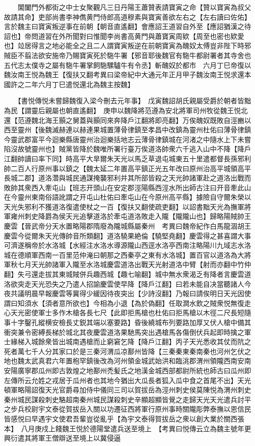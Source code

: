 　　閶闔門外都街之中士女聚觀凡三日丹陽王蕭贊表請寶寅之命【贊以寶寅為叔父故請其命】吏部尚書李神儁黄門侍郎高道穆素與寶寅善欲左右之【左右讀曰佐佑】言於魏主曰寶寅叛逆事在前朝【朝音直遙翻】會應詔王道習自外至【應詔猶漢之待詔也】帝問道習在外所聞對曰惟聞李尚書高黄門與蕭寶寅周欵【周至也密也欵愛也】竝居得言之地必能全之且二人謂寶寅叛逆在前朝寶寅為醜奴太傅豈非陛下時邪賊臣不翦法欲安施帝乃賜寶寅死於駞牛署【邪音耶後魏官有駞牛都尉署者其寺舍也五代志太僕寺之屬有駞牛署掌飼駞騾驢牛有令丞】斬醜奴於都市　六月丁巳帝復以魏汝南王悦為魏王【復扶又翻考異曰梁帝紀中大通元年正月甲子魏汝南王悦求還本國許之二年六月丁巳遣悦還北為魏主按魏】

　　【書悦傳悦未嘗歸魏復入梁今刪去元年事】　戊寅魏詔胡氏親屬受爵於朝者皆黜為民【謂靈后親屬也朝直遙翻】　庚申以魏降將范遵為安北將軍司州牧從魏王悦北還【范遵魏北海王顥之舅蓋與顥同來奔降戶江翻將即亮翻】万俟醜奴既敗自涇豳以西至靈州【後魏滅赫連以赫連果城置薄骨律鎮至孝昌中改鎮為靈州杜佑曰薄骨律鎮今靈武郡富平今迴樂縣唐靈州治迴樂括地志云薄骨律鎮城在河渚之中隨水上下未嘗陷沒故號靈州也】賊黨皆降於魏唯所署行臺万俟道洛帥衆六千逃入山中不降【降戶江翻帥讀曰率下同】時高平大旱爾朱天光以馬乏草退屯城東五十里遣都督長孫邪利帥二百人行原州事以鎮之【魏太延二年置高平鎮正光五年改曰原州治高平城領高平長城二郡】道洛濳與城民通謀掩襲邪利并其所部皆殺之天光帥諸軍赴之道洛出戰而敗帥其衆西入牽屯山【班志开頭山在安定郡涇陽縣西涇水所出師古注曰开音牽此山在今靈州東南俗語訛謂之开屯山杜佑曰牽屯山在今原州高平縣】據險自守爾朱榮以天光失邪利不獲道洛復遣使杖之一百【復扶又翻使疏吏翻】以詔書黜天光為撫軍將軍雍州刺史降爵為侯天光追擊道洛於牽屯道洛敗走入隴【隴隴山也】歸略陽賊帥王慶雲【晉武帝分天水置略陽郡隋廢為隴城縣屬秦州　考異曰魏帝紀作白馬龍涸胡王慶雲今從爾朱天光傳帥音所類翻】道洛驍果絶倫【驍堅堯翻】慶雲得之甚喜謂大事可濟遂稱帝於水洛城【水經注水洛水導源隴山西逕水洛亭西南注略陽川九域志水洛城在德順軍西南一百里范仲淹曰朝那之西秦亭之東有水洛城】置百官以道洛為大將軍秋七月天光帥諸軍入隴至水洛城慶雲道洛出戰天光射道洛中臂【射而亦翻中竹仲翻】失弓還走拔其東城賊併兵趣西城【趣七喻翻】城中無水衆渴乏有降者言慶雲道洛欲突走天光恐失之乃遣人招諭慶雲使早降【降戶江翻】曰若未能自决當聽諸人今夜共議明晨早報慶雲等冀得少緩因待夜突出【少詩沒翻】乃報曰請俟明日天光因使謂曰知須水【須者意所欲也】今相為小退【為於偽翻】任取澗水飲之賊衆悦無復走心天光密使軍士多作木槍各長七尺【此即拒馬槍也杜佑曰拒馬槍以木徑二尺長短隨事十字鑿孔縱横安檢長丈鋭其端以塞要路】昏後繞城布列要路加厚又伏人槍中備其衝突兼令密縛長梯於城北其夜慶雲道洛果馳馬突出遇槍馬各傷倒伏兵起即時擒之軍士緣梯入城餘衆皆出城南遇槍而止窮窘乞降【降戶江翻】丙子天光悉收其仗而阬之死者萬七千人分其家口於是三秦河渭瓜凉鄯州皆降【三秦秦東秦南秦也河州乞伏之地也魏太武真君六年置枹罕鎮後改為河州領金城武始洪和臨洮郡渭州領隴西南安南安陽廣寧郡瓜州即古敦煌之地鄯州禿髪氏之地漢金城西部都尉所統也師古曰瓜州即左傳所云允姓之戎居于瓜州者也其地今猶出大瓜長者狐入瓜中食之首尾不出】天光頓軍略陽詔復天光官爵尋加侍中儀同三司以賀拔岳為涇州刺史侯莫陳悦為渭州刺史秦州城民謀殺刺史駱超南秦州城民謀殺刺史辛顯超顯皆覺之走歸天光天光遣兵討平之步兵校尉宇文泰從賀拔岳入關以功遷征西將軍行原州事時關隴彫弊泰撫以恩信民皆感悦曰早遇宇文使君吾輩豈從亂乎【為宇文泰得賀拔岳之衆以創大業於關西張本】　八月庚戍上餞魏王悦於德陽堂遣兵送至境上　【考異曰悦傳云立為魏主號年更興衍遣其將軍王僧辯送至境上以冀侵逼